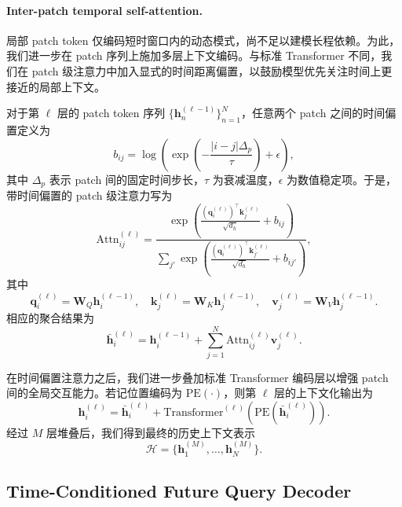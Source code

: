 \paragraph{Inter-patch temporal self-attention.}
局部 patch token 仅编码短时窗口内的动态模式，尚不足以建模长程依赖。为此，我们进一步在 patch 序列上施加多层上下文编码。与标准 Transformer 不同，我们在 patch 级注意力中加入显式的时间距离偏置，以鼓励模型优先关注时间上更接近的局部上下文。

对于第 $\ell$ 层的 patch token 序列 $\{\bm{h}^{(\ell-1)}_n\}_{n=1}^{N}$，任意两个 patch 之间的时间偏置定义为
\begin{equation}
b_{ij} = \log \left( \exp\left(- \frac{|i-j|\Delta_p}{\tau} \right) + \epsilon \right),
\end{equation}
其中 $\Delta_p$ 表示 patch 间的固定时间步长，$\tau$ 为衰减温度，$\epsilon$ 为数值稳定项。于是，带时间偏置的 patch 级注意力写为
\begin{equation}
\mathrm{Attn}_{ij}^{(\ell)} =
\frac{
\exp\!\left(
\frac{(\bm{q}_i^{(\ell)})^\top \bm{k}_j^{(\ell)}}{\sqrt{d_h}} + b_{ij}
\right)
}
{
\sum_{j'} \exp\!\left(
\frac{(\bm{q}_i^{(\ell)})^\top \bm{k}_{j'}^{(\ell)}}{\sqrt{d_h}} + b_{ij'}
\right)
},
\end{equation}
其中
\begin{equation}
\bm{q}_i^{(\ell)} = \bm{W}_Q \bm{h}_i^{(\ell-1)}, \quad
\bm{k}_j^{(\ell)} = \bm{W}_K \bm{h}_j^{(\ell-1)}, \quad
\bm{v}_j^{(\ell)} = \bm{W}_V \bm{h}_j^{(\ell-1)}.
\end{equation}
相应的聚合结果为
\begin{equation}
\bar{\bm{h}}_i^{(\ell)} =
\bm{h}_i^{(\ell-1)} +
\sum_{j=1}^{N} \mathrm{Attn}_{ij}^{(\ell)} \bm{v}_j^{(\ell)}.
\end{equation}

在时间偏置注意力之后，我们进一步叠加标准 Transformer 编码层以增强 patch 间的全局交互能力。若记位置编码为 $\mathrm{PE}(\cdot)$，则第 $\ell$ 层的上下文化输出为
\begin{equation}
\bm{h}_i^{(\ell)} =
\bar{\bm{h}}_i^{(\ell)} +
\mathrm{Transformer}^{(\ell)}\!\left(\mathrm{PE}\!\left(\bar{\bm{h}}_i^{(\ell)}\right)\right).
\end{equation}
经过 $M$ 层堆叠后，我们得到最终的历史上下文表示
\begin{equation}
\mathcal{H} = \{\bm{h}_1^{(M)}, \dots, \bm{h}_N^{(M)}\}.
\end{equation}

\subsection{Time-Conditioned Future Query Decoder}
\label{subsec:decoder}

